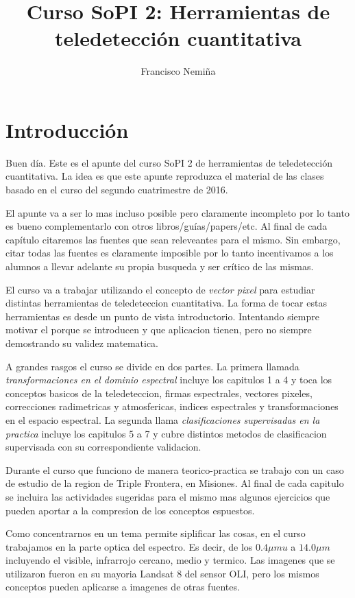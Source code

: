 \documentclass[a4paper,12pt]{article}
\title{Curso SoPI 2: Herramientas de teledetección cuantitativa}
\author{Francisco Nemiña}
\begin{document}
\maketitle
\section*{Introducción}

Buen día. Este es el apunte del curso SoPI 2 de herramientas de teledetección
cuantitativa. La idea es que este apunte reproduzca el material de las clases
basado en el curso del segundo cuatrimestre de 2016.

El apunte va a ser lo mas incluso posible pero claramente incompleto por lo
tanto es bueno complementarlo con otros libros/guías/papers/etc. Al final de
cada capítulo citaremos las fuentes que sean releveantes para el mismo. Sin
embargo, citar todas las fuentes es claramente imposible por lo tanto
incentivamos a los alumnos a llevar adelante su propia busqueda y ser crítico de
las mismas.

El curso va a trabajar utilizando el concepto de \emph{vector pixel} para
estudiar distintas herramientas de teledeteccion cuantitativa. La forma de tocar
estas herramientas es desde un punto de vista introductorio. Intentando siempre
motivar el porque se introducen y que aplicacion tienen, pero no siempre
demostrando su validez matematica.

A grandes rasgos el curso se divide en dos partes. La primera llamada
\emph{transformaciones en el dominio espectral} incluye los capitulos 1 a 4 y
toca los conceptos basicos de la teledeteccion, firmas espectrales, vectores
pixeles, correcciones radimetricas y atmosfericas, indices espectrales y
transformaciones en el espacio espectral. La segunda llama \emph{clasificaciones
supervisadas en la practica} incluye los capitulos 5 a 7 y cubre distintos
metodos de clasificacion supervisada con su correspondiente validacion.

Durante el curso que funciono de manera teorico-practica se trabajo con un caso
de estudio de la region de Triple Frontera, en Misiones. Al final de cada
capitulo se incluira las actividades sugeridas para el mismo mas algunos
ejercicios que pueden aportar a la compresion de los conceptos espuestos.

Como concentrarnos en un tema permite siplificar las cosas, en el curso
trabajamos en la parte optica del espectro. Es decir, de los $0.4\mu mu$ a $14.0
\mu m$ incluyendo el visible, infrarrojo cercano, medio y termico. Las imagenes
que se utilizaron fueron en su mayoria Landsat 8 del sensor OLI, pero los mismos
conceptos pueden aplicarse a imagenes de otras fuentes.
\end{document}
